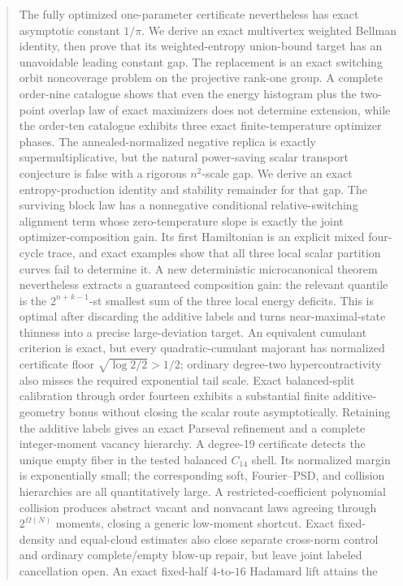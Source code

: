 \documentclass[11pt]{article}
\begin{document}
\begin{abstract}
The fully optimized one-parameter certificate nevertheless has exact
asymptotic constant $1/\pi$.  We derive an exact multivertex weighted Bellman
identity, then prove that its weighted-entropy union-bound target has an
unavoidable leading constant gap.  The replacement is an exact switching
orbit noncoverage problem on the projective rank-one group.  A complete
order-nine catalogue shows that even the energy histogram plus the two-point
overlap law of exact maximizers does not determine extension, while the
order-ten catalogue exhibits three exact finite-temperature optimizer phases.
The annealed-normalized negative replica is exactly supermultiplicative, but
the natural power-saving scalar transport conjecture is false with a rigorous
$n^2$-scale gap.  We derive an exact entropy-production identity and stability
remainder for that gap.  The surviving block law has a nonnegative
conditional relative-switching alignment term whose zero-temperature slope is
exactly the joint optimizer-composition gain.  Its first Hamiltonian is an
explicit mixed four-cycle trace, and exact examples show that all three local
scalar partition curves fail to determine it.  A new deterministic
microcanonical theorem nevertheless extracts a guaranteed composition gain:
the relevant quantile is the $2^{n+k-1}$-st smallest sum of the three local
energy deficits.  This is optimal after discarding the additive labels and
turns near-maximal-state thinness into a precise large-deviation target.
An equivalent cumulant criterion is exact, but every quadratic-cumulant
majorant has normalized certificate floor
$\sqrt{\log2/2}>1/2$; ordinary degree-two hypercontractivity also misses the
required exponential tail scale.  Exact balanced-split calibration through
order fourteen exhibits a substantial finite additive-geometry bonus without
closing the scalar route asymptotically.
Retaining the additive labels gives an exact Parseval refinement and a
complete integer-moment vacancy hierarchy.  A degree-19 certificate detects
the unique empty fiber in the tested balanced $C_{14}$ shell.  Its normalized
margin is exponentially small; the corresponding soft, Fourier--PSD, and
collision hierarchies are all quantitatively large.  A restricted-coefficient
polynomial collision produces abstract vacant and nonvacant laws agreeing
through $2^{\Omega(N)}$ moments, closing a generic low-moment shortcut.
Exact fixed-density and equal-cloud estimates also close separate cross-norm
control and ordinary complete/empty blow-up repair, but leave joint labeled
cancellation open.  An exact fixed-half $4$-to-$16$ Hadamard lift attains the

\end{abstract}
\end{document}
